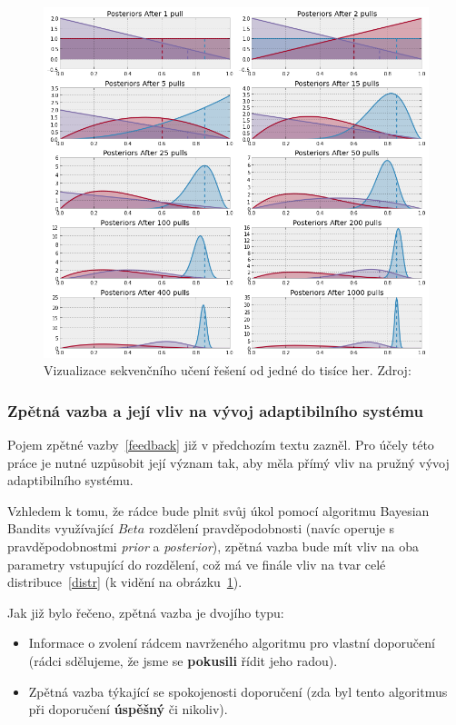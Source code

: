 \documentclass[thesis=M,czech]{FITthesis}[2014/05/07]
\begin{document}
\begin{figure}\centering
	\includegraphics[width=1.0\textwidth]{obr/posteriors.png}
 	\caption[Vizualizace sekvenčního učení řešení od jedné do tisíce her.]{Vizualizace sekvenčního učení řešení od jedné do tisíce her. Zdroj: \cite{camdp}}\label{fig:posteriors}
\end{figure}	

\subsubsection{Zpětná vazba a její vliv na vývoj adaptibilního systému}
\label{subsub:feedback}
Pojem zpětné vazby~\ref{feedback} již v předchozím textu zazněl. Pro účely této práce je nutné uzpůsobit její význam tak, aby měla přímý vliv na pružný vývoj adaptibilního systému.

Vzhledem k tomu, že rádce bude plnit svůj úkol pomocí algoritmu Bayesian Bandits využívající ${Beta}$ rozdělení pravděpodobnosti (navíc operuje s pravděpodobnostmi \emph{prior} a \emph{posterior}), zpětná vazba bude mít vliv na oba parametry vstupující do rozdělení, což má ve finále vliv na tvar celé distribuce~\ref{distr} (k vidění na obrázku~\ref{fig:posteriors}). 

Jak již bylo řečeno, zpětná vazba je dvojího typu:

\begin{itemize}
	\item Informace o zvolení rádcem navrženého algoritmu pro vlastní doporučení (rádci sdělujeme, že jsme se \textbf{pokusili} řídit jeho radou).
	\item Zpětná vazba týkající se spokojenosti doporučení (zda byl tento algoritmus při doporučení \textbf{úspěšný} či nikoliv).
\end{itemize}
\end{document}
